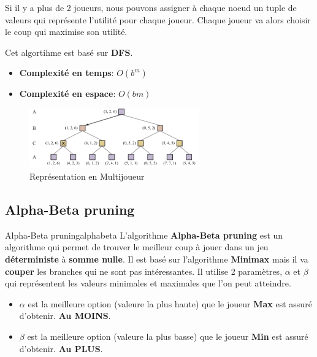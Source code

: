 Si il y a plus de 2 joueurs, nous pouvons assigner à chaque noeud un tuple de valeurs qui représente l'utilité pour chaque joueur. 
Chaque joueur va alors choisir le coup qui maximise son utilité. 

\begin{remark}\leavevmode
    Cet algortihme est basé sur \textbf{DFS}. 
    \begin{itemize}
        \item \textbf{Complexité en temps}: $O(b^m)$
        \item \textbf{Complexité en espace}: $O(bm)$
    \end{itemize}
\end{remark}

\begin{figure}
    \begin{center}
        \includegraphics[width=0.65\textwidth]{./pictures/multiminimax.png}
    \end{center}
    \caption{Représentation en Multijoueur}\label{fig:mutliminimax}
\end{figure}

\subsection{Alpha-Beta pruning} %
\label{sub:alpha_beta_pruning}

\begin{definition}{Alpha-Beta pruning}{alphabeta}
    L'algorithme \textbf{Alpha-Beta pruning} est un algorithme qui permet de trouver le meilleur coup à jouer dans un jeu \textbf{déterministe} à \textbf{somme nulle}.
    Il est basé sur l'algorithme \textbf{Minimax} mais il va \textbf{couper} les branches qui ne sont pas intéressantes.
    Il utilise 2 paramètres, $\alpha$ et $\beta$ qui représentent les valeurs minimales et maximales que l'on peut atteindre.
    \begin{itemize}
        \item $\alpha$ est la meilleure option (valeure la plus haute) que le joueur \textbf{Max} est assuré d'obtenir. 
            \textbf{Au MOINS}.
        \item $\beta$ est la meilleure option (valeure la plus basse) que le joueur \textbf{Min} est assuré d'obtenir. 
            \textbf{Au PLUS}.
    \end{itemize} 
\end{definition}


